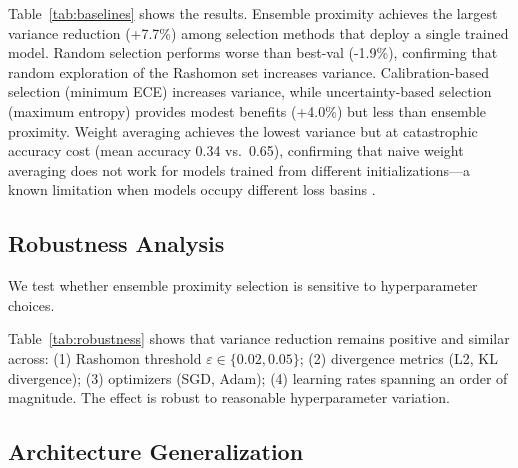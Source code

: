 \documentclass[11pt]{article}
\begin{document}
\begin{table}[ht]
  \centering
  \caption{Comparison of selection criteria across all 22 DGP configurations.
    Variance reduction is relative to best validation accuracy baseline.
    Ensemble proximity achieves the best variance reduction among singleton-selection methods.}
  \label{tab:baselines}
  
\end{table}

Table~\ref{tab:baselines} shows the results.
Ensemble proximity achieves the largest variance reduction (+7.7\%) among selection methods that deploy a single trained model.
Random selection performs worse than best-val (-1.9\%), confirming that random exploration of the Rashomon set increases variance.
Calibration-based selection (minimum ECE) increases variance, while uncertainty-based selection (maximum entropy) provides modest benefits (+4.0\%) but less than ensemble proximity.
Weight averaging achieves the lowest variance but at catastrophic accuracy cost (mean accuracy 0.34 vs.\ 0.65), confirming that naive weight averaging does not work for models trained from different initializations---a known limitation when models occupy different loss basins \citep{fort2020deep}.


\subsection{Robustness Analysis}
\label{sec:robustness}

We test whether ensemble proximity selection is sensitive to hyperparameter choices.

\begin{table}[ht]
  \centering
  \caption{Robustness checks.
    Results are stable across Rashomon thresholds, divergence metrics, optimizers, and learning rates.}
  \label{tab:robustness}
  
\end{table}

Table~\ref{tab:robustness} shows that variance reduction remains positive and similar across:
(1) Rashomon threshold $\varepsilon \in \{0.02, 0.05\}$;
(2) divergence metrics (L2, KL divergence);
(3) optimizers (SGD, Adam);
(4) learning rates spanning an order of magnitude.
The effect is robust to reasonable hyperparameter variation.


\subsection{Architecture Generalization}
\label{sec:architectures}
\end{document}
